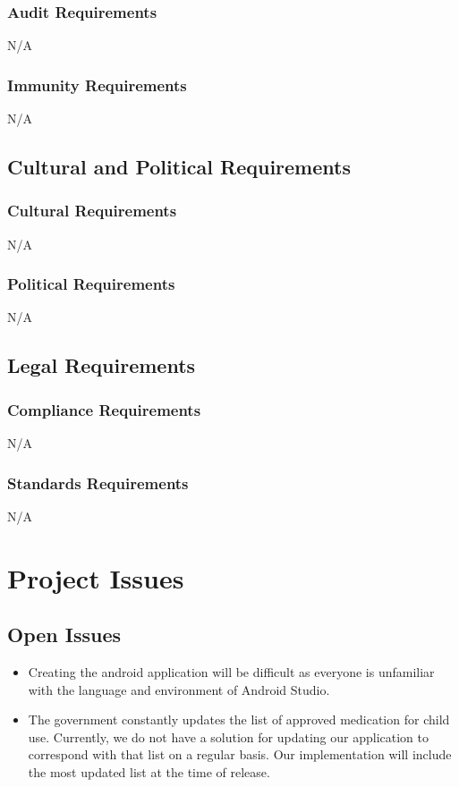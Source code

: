 \documentclass[12pt]{article}
\begin{document}
\subsubsection{Audit Requirements}
N/A

\subsubsection{Immunity Requirements}
N/A

\subsection{Cultural and Political Requirements}
\subsubsection{Cultural Requirements}
N/A
\subsubsection{Political Requirements}
N/A

\subsection{Legal Requirements}
\subsubsection{Compliance Requirements}
N/A
\subsubsection{Standards Requirements}
N/A

\section{Project Issues}
\setcounter{subsection}{17}
\subsection{Open Issues}
\begin{itemize}
\item Creating the android application will be difficult as everyone is unfamiliar with the language and environment of Android Studio.
\item The government constantly updates the list of approved medication for child use. Currently, we do not have a solution for updating our application to correspond with that list on a regular basis. Our implementation will include the most updated list at the time of release.
\end{itemize}
\end{document}
